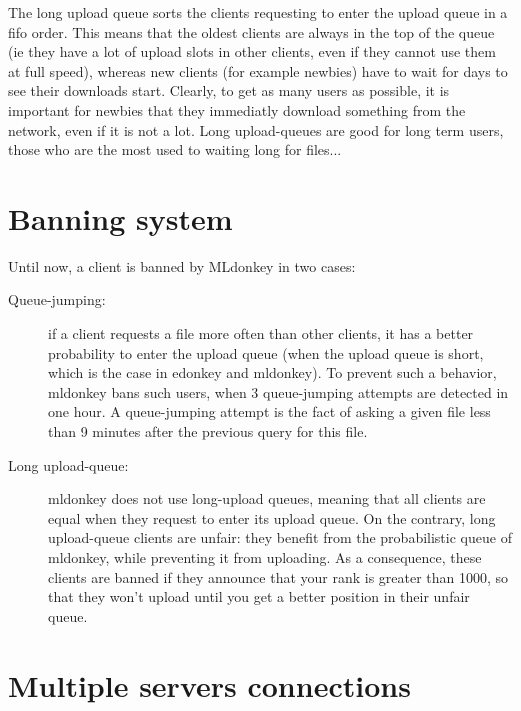 \documentclass{article}
\begin{document}
 The long upload queue sorts the clients requesting to enter the upload
queue in a fifo order. This means that the oldest clients are always in the
top of the queue (ie they have a lot of upload slots in other clients, even
if they cannot use them at full speed), whereas new clients (for example
newbies) have to wait for days to see their downloads start. Clearly, 
to get as many users as possible, it is important for newbies that they 
immediatly download something from the network, even if it is not a lot.
Long upload-queues are good for long term users, those who are the most used
to waiting long for files...

\section{Banning system}

Until now, a client is banned by MLdonkey in two cases:

\begin{description}

 \item[Queue-jumping:] if a client requests a file more often than other
clients, it has a better probability to enter the upload queue (when the
upload queue is short, which is the case in edonkey and mldonkey). To prevent
such a behavior, mldonkey bans such users, when 3 queue-jumping attempts are
detected in one hour. A queue-jumping attempt is the fact of asking a given file less than 9 minutes after the previous query for this file.

 \item[Long upload-queue:] mldonkey does not use long-upload queues,
meaning that all clients are equal when they request to enter its upload
queue. On the contrary, long upload-queue clients are unfair: they benefit
from the probabilistic queue of mldonkey, while preventing it from uploading.
As a consequence, these clients are banned if they announce that your rank is
greater than 1000, so that they won't upload until you get a better position
in their unfair queue.

\end{description}

\section{Multiple servers connections}
\end{document}
